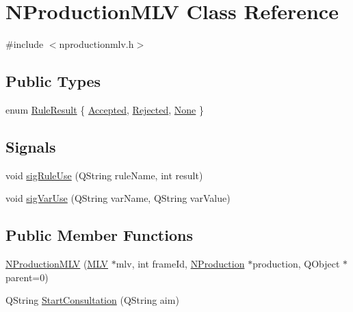 \hypertarget{class_n_production_m_l_v}{
\section{NProductionMLV Class Reference}
\label{class_n_production_m_l_v}
}


{\ttfamily \#include $<$nproductionmlv.h$>$}

\subsection*{Public Types}
\begin{DoxyCompactItemize}
\item 
enum \hyperlink{class_n_production_m_l_v_a692c49ad5d09fe235df8cd0279cefb9a}{RuleResult} \{ \hyperlink{class_n_production_m_l_v_a692c49ad5d09fe235df8cd0279cefb9aa15b19f66ace4cd16ec6e5597543416f2}{Accepted}, 
\hyperlink{class_n_production_m_l_v_a692c49ad5d09fe235df8cd0279cefb9aabfd49ff629cded4b9d8699a2dbd004dd}{Rejected}, 
\hyperlink{class_n_production_m_l_v_a692c49ad5d09fe235df8cd0279cefb9aa50ecdc6718d357d6cdec6fef0c2bb9a6}{None}
 \}
\end{DoxyCompactItemize}
\subsection*{Signals}
\begin{DoxyCompactItemize}
\item 
void \hyperlink{class_n_production_m_l_v_a40d4c7b8f9da5cfcc7094c5c7c48b09b}{sigRuleUse} (QString ruleName, int result)
\item 
void \hyperlink{class_n_production_m_l_v_ab01dc86dbe07cae80ed724ed373da4e3}{sigVarUse} (QString varName, QString varValue)
\end{DoxyCompactItemize}
\subsection*{Public Member Functions}
\begin{DoxyCompactItemize}
\item 
\hyperlink{class_n_production_m_l_v_a66d0277eba93bba51b8f5207e03b581e}{NProductionMLV} (\hyperlink{class_m_l_v}{MLV} $\ast$mlv, int frameId, \hyperlink{class_n_production}{NProduction} $\ast$production, QObject $\ast$parent=0)
\item 
QString \hyperlink{class_n_production_m_l_v_a8f51658f5e9578e45b6de153431d5b8f}{StartConsultation} (QString aim)
\end{DoxyCompactItemize}
